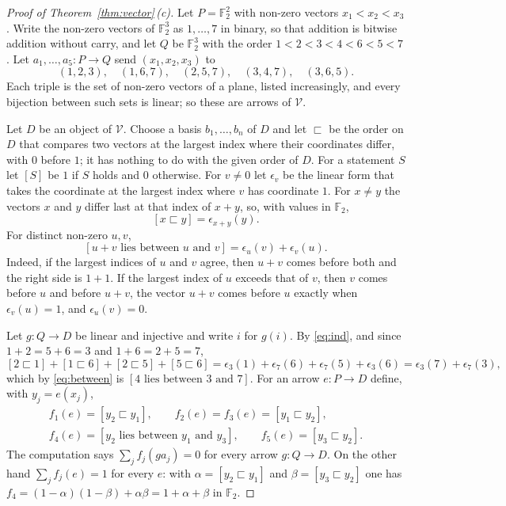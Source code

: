 \documentclass[11pt,a4paper]{article}
\theoremstyle{definition}
\newcommand{\V}{\mathcal{V}}
\newcommand{\F}{\mathbb{F}}
\begin{document}
\begin{proof}[Proof of Theorem~\ref{thm:vector}\,\textup{(c)}]
Let $P=\F_2^2$ with non-zero vectors $x_1<x_2<x_3$. Write the non-zero
vectors of $\F_2^3$ as $1,\dots,7$ in binary, so that addition is bitwise
addition without carry, and let $Q$ be $\F_2^3$ with the order
$1<2<3<4<6<5<7$. Let $a_1,\dots,a_5\colon P\to Q$ send $(x_1,x_2,x_3)$ to
\[
 (1,2,3),\quad(1,6,7),\quad(2,5,7),\quad(3,4,7),\quad(3,6,5).
\]
Each triple is the set of non-zero vectors of a plane, listed increasingly,
and every bijection between such sets is linear; so these are arrows of
$\V$.

Let $D$ be an object of $\V$. Choose a basis $b_1,\dots,b_n$ of $D$ and let
$\sqsubset$ be the order on $D$ that compares two vectors at the largest
index where their coordinates differ, with $0$ before $1$; it has nothing to
do with the given order of $D$. For a statement $S$ let $[S]$ be $1$ if $S$
holds and $0$ otherwise. For $v\ne0$ let $\epsilon_v$ be the linear
form that takes the coordinate at the largest index where $v$ has
coordinate $1$. For $x\ne y$ the vectors $x$ and $y$ differ last at that
index of $x+y$, so, with values in $\F_2$,
\begin{equation}\label{eq:ind}
 [x\sqsubset y]=\epsilon_{x+y}(y).
\end{equation}
For distinct non-zero $u,v$,
\begin{equation}\label{eq:between}
 [u+v\text{ lies between }u\text{ and }v]=\epsilon_u(v)+\epsilon_v(u).
\end{equation}
Indeed, if the largest indices of $u$ and $v$ agree, then $u+v$ comes before
both and the right side is $1+1$. If the largest index of $u$ exceeds that
of $v$, then $v$ comes before $u$ and before $u+v$, the vector $u+v$ comes
before $u$ exactly when $\epsilon_v(u)=1$, and $\epsilon_u(v)=0$.

Let $g\colon Q\to D$ be linear and injective and write $i$ for $g(i)$. By
\eqref{eq:ind}, and since $1+2=5+6=3$ and $1+6=2+5=7$,
\[
 [2\sqsubset1]+[1\sqsubset6]+[2\sqsubset5]+[5\sqsubset6]
 =\epsilon_3(1)+\epsilon_7(6)+\epsilon_7(5)+\epsilon_3(6)
 =\epsilon_3(7)+\epsilon_7(3),
\]
which by \eqref{eq:between} is $[4\text{ lies between }3\text{ and }7]$. For
an arrow $e\colon P\to D$ define, with $y_j=e(x_j)$,
\begin{gather*}
 f_1(e)=[y_2\sqsubset y_1],\qquad f_2(e)=f_3(e)=[y_1\sqsubset y_2],\\
 f_4(e)=[y_2\text{ lies between }y_1\text{ and }y_3],\qquad
 f_5(e)=[y_3\sqsubset y_2].
\end{gather*}
The computation says $\sum_jf_j(ga_j)=0$ for every arrow $g\colon Q\to D$.
On the other hand $\sum_jf_j(e)=1$ for every $e$: with
$\alpha=[y_2\sqsubset y_1]$ and $\beta=[y_3\sqsubset y_2]$ one has
$f_4=(1-\alpha)(1-\beta)+\alpha\beta=1+\alpha+\beta$ in $\F_2$.


\end{proof}
\end{document}
